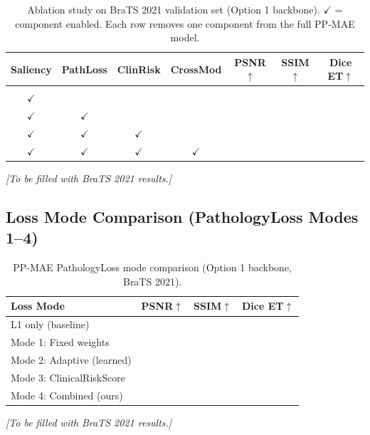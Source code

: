 \documentclass[runningheads]{llncs}
\begin{document}
\begin{table}[t]
\centering
\caption{Ablation study on BraTS 2021 validation set (Option 1 backbone).
  $\checkmark$ = component enabled. Each row removes one component from
  the full PP-MAE model.}
\label{tab:ablation}
\setlength{\tabcolsep}{5pt}
\begin{tabular}{ccccccc}
\toprule
\textbf{Saliency} & \textbf{PathLoss} & \textbf{ClinRisk}
  & \textbf{CrossMod} & \textbf{PSNR$\uparrow$} & \textbf{SSIM$\uparrow$}
  & \textbf{Dice ET$\uparrow$} \\
\midrule
                  &                   &             &            & & & \\  %
$\checkmark$      &                   &             &            & & & \\  %
$\checkmark$      & $\checkmark$      &             &            & & & \\  %
$\checkmark$      & $\checkmark$      & $\checkmark$ &           & & & \\  %
\rowcolor{ppmae}
$\checkmark$      & $\checkmark$      & $\checkmark$ & $\checkmark$ & & & \\ %
\bottomrule
\end{tabular}
{\footnotesize \emph{[To be filled with BraTS 2021 results.]} }
\end{table}

\subsection{Loss Mode Comparison (PathologyLoss Modes 1–4)}

\begin{table}[t]
\centering
\caption{PP-MAE PathologyLoss mode comparison (Option 1 backbone, BraTS 2021).}
\label{tab:modes}
\begin{tabular}{lccc}
\toprule
\textbf{Loss Mode} & \textbf{PSNR$\uparrow$} & \textbf{SSIM$\uparrow$} & \textbf{Dice ET$\uparrow$} \\
\midrule
L1 only (baseline)         & & & \\
Mode 1: Fixed weights      & & & \\
Mode 2: Adaptive (learned) & & & \\
Mode 3: ClinicalRiskScore  & & & \\
\rowcolor{ppmae}
Mode 4: Combined (ours)    & & & \\
\bottomrule
\end{tabular}
{\footnotesize \emph{[To be filled with BraTS 2021 results.]} }
\end{table}
\end{document}
